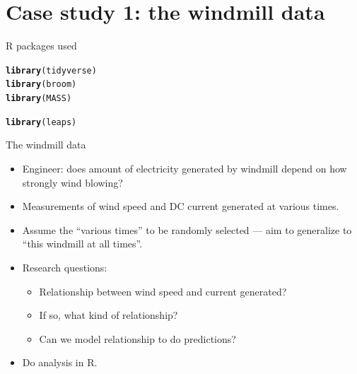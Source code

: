 \documentclass[unknownkeysallowed]{beamer}\usepackage[]{graphicx}\usepackage[]{color}
\makeatletter
\newcommand{\hlstd}[1]{\textcolor[rgb]{0.345,0.345,0.345}{#1}}%
\newcommand{\hlkwd}[1]{\textcolor[rgb]{0.737,0.353,0.396}{\textbf{#1}}}%
\newenvironment{kframe}{%
 \def\at@end@of@kframe{}%
 \ifinner\ifhmode%
  \def\at@end@of@kframe{\end{minipage}}%
  \begin{minipage}{\columnwidth}%
 \fi\fi%
 \def\FrameCommand##1{\hskip\@totalleftmargin \hskip-\fboxsep
 \colorbox{shadecolor}{##1}\hskip-\fboxsep
     \hskip-\linewidth \hskip-\@totalleftmargin \hskip\columnwidth}%
 \MakeFramed {\advance\hsize-\width
   \@totalleftmargin\z@ \linewidth\hsize
   \@setminipage}}%
 {\par\unskip\endMakeFramed%
 \at@end@of@kframe}
\newenvironment{knitrout}{}{} %
\makeatother
\begin{document}


\section{Case study 1: the windmill data}

\frame{\sectionpage}


\begin{frame}[fragile]{R packages used}
  
\begin{knitrout}\scriptsize
{}\color{fgcolor}\begin{kframe}
\begin{alltt}
\hlkwd{library}\hlstd{(tidyverse)}
\hlkwd{library}\hlstd{(broom)}
\hlkwd{library}\hlstd{(MASS)}
\end{alltt}


{\ttfamily\noindent\itshape\color{messagecolor}{\#\# \\\#\# Attaching package: 'MASS'}}

{\ttfamily\noindent\itshape\color{messagecolor}{\#\# The following object is masked from 'package:dplyr':\\\#\# \\\#\#\ \ \ \  select}}\begin{alltt}
\hlkwd{library}\hlstd{(leaps)}
\end{alltt}
\end{kframe}
\end{knitrout}
  
\end{frame}

\begin{frame}[fragile]{The windmill data}

  \begin{itemize}
  \item Engineer: does amount of electricity generated by windmill
    depend on how strongly wind blowing?
  \item Measurements of wind speed and DC current generated at various times.
  \item Assume the ``various times'' to be randomly selected --- aim
    to generalize to ``this windmill at all times''.
  \item Research questions:
    \begin{itemize}
    \item Relationship between wind speed and current generated?
    \item If so, what kind of relationship?
    \item Can we model relationship to do predictions?
    \end{itemize}
  \item Do analysis in R.
  \end{itemize}

\end{frame}
\end{document}
